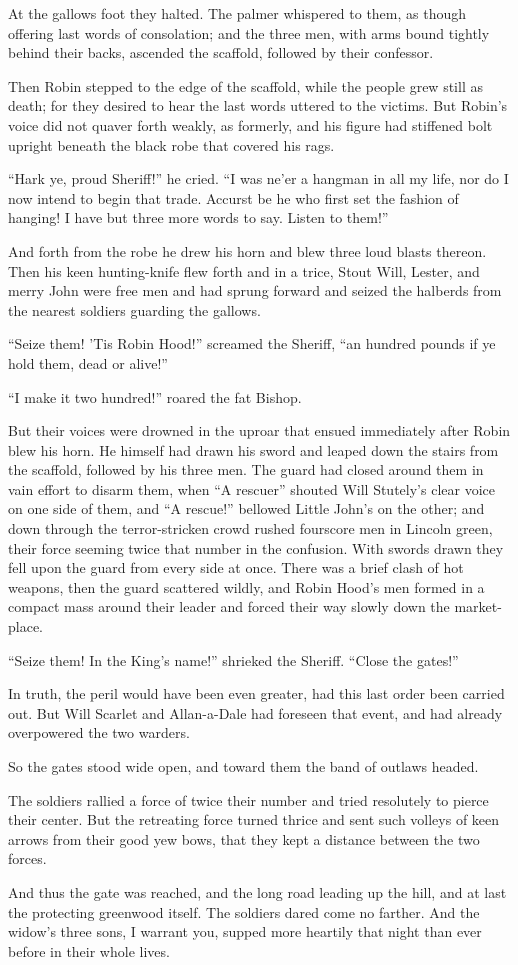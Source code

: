At the gallows foot they halted. The palmer whispered to them, as though
offering last words of consolation; and the three men, with arms bound
tightly behind their backs, ascended the scaffold, followed by their
confessor.

Then Robin stepped to the edge of the scaffold, while the people grew
still as death; for they desired to hear the last words uttered to the
victims. But Robin's voice did not quaver forth weakly, as formerly, and
his figure had stiffened bolt upright beneath the black robe that
covered his rags.

``Hark ye, proud Sheriff!'' he cried. ``I was ne'er a hangman in all my
life, nor do I now intend to begin that trade. Accurst be he who first
set the fashion of hanging! I have but three more words to say. Listen
to them!''

And forth from the robe he drew his horn and blew three loud blasts
thereon. Then his keen hunting-knife flew forth and in a trice, Stout
Will, Lester, and merry John were free men and had sprung forward and
seized the halberds from the nearest soldiers guarding the gallows.

``Seize them! 'Tis Robin Hood!'' screamed the Sheriff, ``an hundred
pounds if ye hold them, dead or alive!''

``I make it two hundred!'' roared the fat Bishop.

But their voices were drowned in the uproar that ensued immediately
after Robin blew his horn. He himself had drawn his sword and leaped
down the stairs from the scaffold, followed by his three men. The guard
had closed around them in vain effort to disarm them, when ``A rescuer''
shouted Will Stutely's clear voice on one side of them, and ``A
rescue!'' bellowed Little John's on the other; and down through the
terror-stricken crowd rushed fourscore men in Lincoln green, their force
seeming twice that number in the confusion. With swords drawn they fell
upon the guard from every side at once. There was a brief clash of hot
weapons, then the guard scattered wildly, and Robin Hood's men formed in
a compact mass around their leader and forced their way slowly down the
market-place.

``Seize them! In the King's name!'' shrieked the Sheriff. ``Close the
gates!''

In truth, the peril would have been even greater, had this last order
been carried out. But Will Scarlet and Allan-a-Dale had foreseen that
event, and had already overpowered the two warders.

So the gates stood wide open, and toward them the band of outlaws
headed.

The soldiers rallied a force of twice their number and tried resolutely
to pierce their center. But the retreating force turned thrice and sent
such volleys of keen arrows from their good yew bows, that they kept a
distance between the two forces.

And thus the gate was reached, and the long road leading up the hill,
and at last the protecting greenwood itself. The soldiers dared come no
farther. And the widow's three sons, I warrant you, supped more heartily
that night than ever before in their whole lives.
